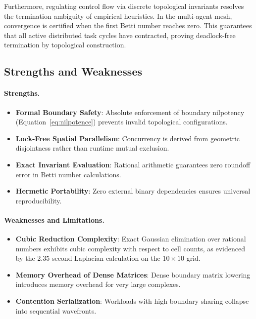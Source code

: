 \documentclass[10pt,a4paper]{article}
\begin{document}
Furthermore, regulating control flow via discrete topological invariants resolves the termination ambiguity of empirical heuristics. In the multi-agent mesh, convergence is certified when the first Betti number reaches zero. This guarantees that all active distributed task cycles have contracted, proving deadlock-free termination by topological construction.

\subsection{Strengths and Weaknesses}

\paragraph{Strengths.}
\begin{itemize}
    \item \textbf{Formal Boundary Safety}: Absolute enforcement of boundary nilpotency (Equation~\ref{eq:nilpotence}) prevents invalid topological configurations.
    \item \textbf{Lock-Free Spatial Parallelism}: Concurrency is derived from geometric disjointness rather than runtime mutual exclusion.
    \item \textbf{Exact Invariant Evaluation}: Rational arithmetic guarantees zero roundoff error in Betti number calculations.
    \item \textbf{Hermetic Portability}: Zero external binary dependencies ensures universal reproducibility.
\end{itemize}

\paragraph{Weaknesses and Limitations.}
\begin{itemize}
    \item \textbf{Cubic Reduction Complexity}: Exact Gaussian elimination over rational numbers exhibits cubic complexity with respect to cell counts, as evidenced by the 2.35-second Laplacian calculation on the $10 \times 10$ grid.
    \item \textbf{Memory Overhead of Dense Matrices}: Dense boundary matrix lowering introduces memory overhead for very large complexes.
    \item \textbf{Contention Serialization}: Workloads with high boundary sharing collapse into sequential wavefronts.
\end{itemize}
\end{document}
